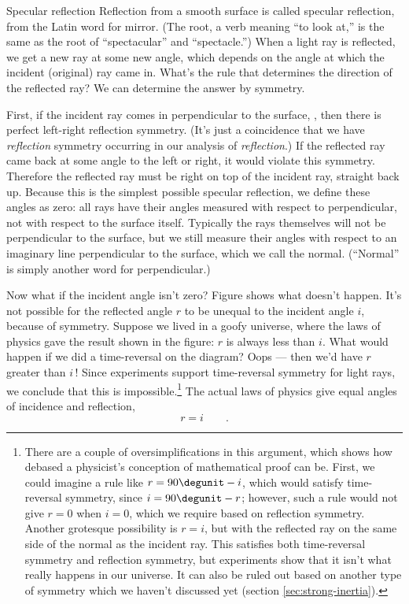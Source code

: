 \begin{envsubsection}{Specular reflection}
Reflection from a smooth surface is called specular reflection, from the Latin word
for mirror. (The root, a verb meaning ``to look at,'' is the same as the root of ``spectacular''
and ``spectacle.'') When a light ray is reflected, we get a new ray at some new angle, which
depends on the angle at which the incident (original) ray came in. What's the rule that determines
the direction of the reflected ray? We can determine the answer by symmetry.

First, if
the incident ray comes in perpendicular to the surface, ,
then there is perfect left-right
reflection symmetry. (It's just a coincidence that we have \emph{reflection} symmetry
occurring in our analysis of \emph{reflection}.) If the reflected ray came back at some
angle to the left or right, it would violate this symmetry. Therefore the reflected
ray must be right on top of the incident ray, straight back up.
Because this is the simplest possible
specular reflection, we define these angles as zero: all rays have their angles
measured with respect to perpendicular, not with respect to the surface itself.
Typically the rays themselves will not be perpendicular to the surface, but we still
measure their angles with respect to an imaginary line perpendicular to the surface,
which we call the normal. (``Normal'' is simply another word for perpendicular.)

Now what if the incident angle isn't zero? Figure  shows
what doesn't happen. It's not possible for the reflected angle $r$ to be unequal to
the incident angle $i$, because of symmetry. Suppose we lived in a goofy universe, where
the laws of physics gave the result shown in the figure: $r$ is always less than
$i$. What would happen if we did a time-reversal on the diagram? Oops --- then
we'd have $r$ greater than $i\,$! Since experiments support time-reversal symmetry
for light rays, we conclude that this is impossible.\footnote{There are a couple
of oversimplifications in this argument, which shows how debased a physicist's conception
of mathematical proof can be. First, we could imagine a rule like $r=90\degunit-i$,
which would satisfy time-reversal symmetry, since $i=90\degunit-r$; however, such a
rule would not give $r=0$ when $i=0$, which we require based on reflection symmetry.
Another grotesque possibility is $r=i$, but with the reflected ray on the same side
of the normal as the incident ray. This satisfies both time-reversal symmetry and
reflection symmetry, but experiments show that it isn't what really happens in our
universe. It can also be ruled out based on another type of symmetry which we haven't
discussed yet (section \ref{sec:strong-inertia}).} The actual laws of physics
give equal angles of incidence and reflection,
\begin{equation*}
	r = i \qquad .
\end{equation*}


\end{envsubsection}
